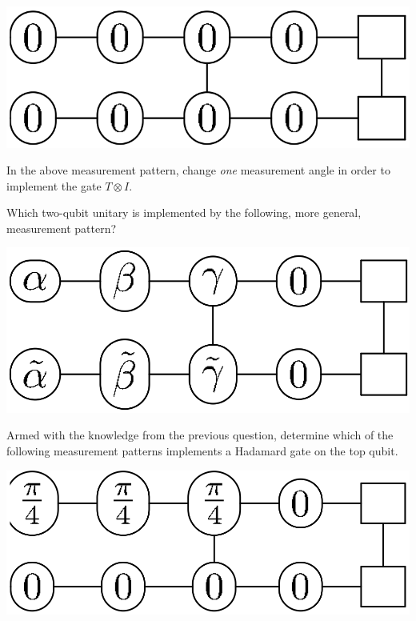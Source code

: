 \documentclass[a4paper,10pt,landscape,twocolumn]{scrartcl}
\begin{document}
\begin{exercise}
\begin{subex}
		\begin{center}
			\includegraphics[]{10-practice-img2.png}
		\end{center}
	\end{subex}
	\begin{subex}
		In the above measurement pattern, change \emph{one} measurement angle in order to implement the gate $T \otimes I$.
	\end{subex}
	\begin{subex}
		Which two-qubit unitary is implemented by the following, more general, measurement pattern?
		\begin{center}
			\includegraphics[]{10-practice-img3.png}
		\end{center}
	\end{subex}
	\begin{subex}
		Armed with the knowledge from the previous question, determine which of the following measurement patterns implements a Hadamard gate on the top qubit.
		\begin{center}
			\includegraphics[]{10-practice-img4.png}\qquad

\end{center}
\end{subex}
\end{exercise}
\end{document}

